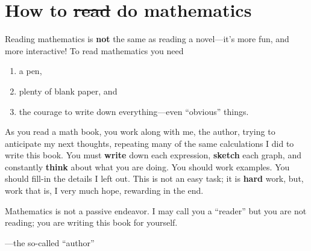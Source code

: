 \documentclass[justified]{tufte-book}
\begin{document}






\chapter*{How to \sout{read} do mathematics}

Reading mathematics is \textbf{not} the same as reading a novel---it's
more fun, and more interactive!  To read mathematics you need
\begin{enumerate}
\item a pen,
\item plenty of blank paper, and
\item the courage to write down everything---even ``obvious'' things.
\end{enumerate}
As you read a math book, you work along with me, the author, trying to
anticipate my next thoughts, repeating many of the same calculations I
did to write this book.  You must \textbf{write} down each expression,
\textbf{sketch} each graph, and constantly \textbf{think} about what
you are doing.  You should work examples.  You should fill-in the
details I left out.  This is not an easy task; it is \textbf{hard}
work, but, work that is, I very much hope, rewarding in the end.

Mathematics is not a passive endeavor.  I may call you a ``reader''
but you are not reading; you are writing this book for yourself.

\vspace{0.5in}
\hfill---the so-called ``author''

\mainmatter
\end{document}
